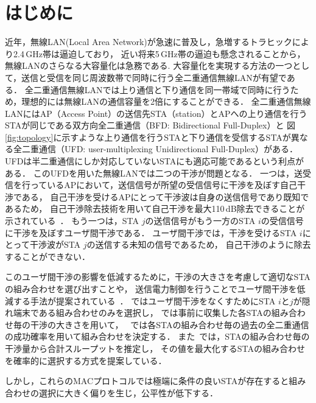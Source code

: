 \documentclass[technicalreport]{ieicej}
\begin{document}

\maketitle

\section{はじめに}
	近年，無線LAN(Local Area Network)が急速に普及し，急増するトラヒックにより2.4\,GHz帯は逼迫しており，
	近い将来5\,GHz帯の逼迫も懸念されることから，無線LANのさらなる大容量化は急務である.
	大容量化を実現する方法の一つとして，送信と受信を同じ周波数帯で同時に行う全二重通信無線LANが有望である．
	全二重通信無線LANでは上り通信と下り通信を同一帯域で同時に行うため，理想的には無線LANの通信容量を2倍にすることができる．
	全二重通信無線LANにはAP（Access Point）の送信先STA（station）とAPへの上り通信を行うSTAが同じである双方向全二重通信（BFD: Bidirectional Full-Duplex）と
	図\ref{fig:topology}に示すような上り通信を行うSTAと下り通信を受信するSTAが異なる全二重通信（UFD: user-multiplexing Unidirectional Full-Duplex）がある．
	UFDは半二重通信にしか対応していないSTAにも適応可能であるという利点がある．
	このUFDを用いた無線LANでは二つの干渉が問題となる．
	一つは，送受信を行っているAPにおいて，送信信号が所望の受信信号に干渉を及ぼす自己干渉である，
	自己干渉を受けるAPにとって干渉波は自身の送信信号であり既知であるため，
	自己干渉除去技術を用いて自己干渉を最大110\,dB除去できることが示されている~\cite{fdmac, stanford1}．
	もう一つは，STA $j$の送信信号がもう一方のSTA $i$の受信信号に干渉を及ぼすユーザ間干渉である．
	ユーザ間干渉では，干渉を受けるSTA $i$にとって干渉波がSTA $j$の送信する未知の信号であるため，
	自己干渉のように除去することができない．
	\par
	このユーザ間干渉の影響を低減するために，干渉の大きさを考慮して適切なSTAの組み合わせを選び出すことや，
	送信電力制御を行うことでユーザ間干渉を低減する手法が提案されている~\cite{fdmac3, goyal, janus, contra, promac}．
	\cite{fdmac3}ではユーザ間干渉をなくすためにSTA $i$と$j$が隠れ端末である組み合わせのみを選択し，
	\cite{goyal, janus}では事前に収集した各STAの組み合わせ毎の干渉の大きさを用いて，
	~\cite{contra}では各STAの組み合わせ毎の過去の全二重通信の成功確率を用いて組み合わせを決定する．
	また~\cite{promac}では，STAの組み合わせ毎の干渉量から合計スループットを推定し，
	その値を最大化するSTAの組み合わせを確率的に選択する方式を提案している．
	\par
	しかし，これらのMACプロトコルでは極端に条件の良いSTAが存在すると組み合わせの選択に大きく偏りを生じ，公平性が低下する．
\end{document}
